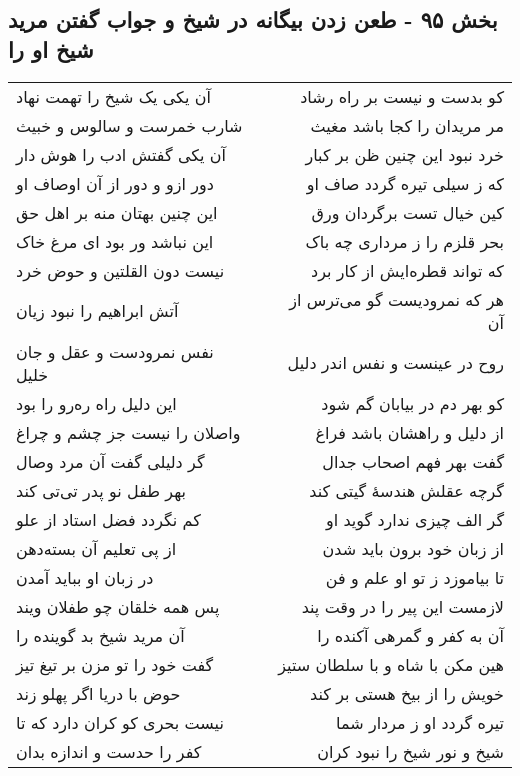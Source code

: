 \begin{center}
\section*{بخش ۹۵ - طعن زدن بیگانه در شیخ و جواب گفتن مرید شیخ او را}
\label{sec:sh095}
\begin{longtable}{l p{0.5cm} r}
آن یکی یک شیخ را تهمت نهاد
&&
کو بدست و نیست بر راه رشاد
\\
شارب خمرست و سالوس و خبیث
&&
مر مریدان را کجا باشد مغیث
\\
آن یکی گفتش ادب را هوش دار
&&
خرد نبود این چنین ظن بر کبار
\\
دور ازو و دور از آن اوصاف او
&&
که ز سیلی تیره گردد صاف او
\\
این چنین بهتان منه بر اهل حق
&&
کین خیال تست برگردان ورق
\\
این نباشد ور بود ای مرغ خاک
&&
بحر قلزم را ز مرداری چه باک
\\
نیست دون القلتین و حوض خرد
&&
که تواند قطره‌ایش از کار برد
\\
آتش ابراهیم را نبود زیان
&&
هر که نمرودیست گو می‌ترس از آن
\\
نفس نمرودست و عقل و جان خلیل
&&
روح در عینست و نفس اندر دلیل
\\
این دلیل راه ره‌رو را بود
&&
کو بهر دم در بیابان گم شود
\\
واصلان را نیست جز چشم و چراغ
&&
از دلیل و راهشان باشد فراغ
\\
گر دلیلی گفت آن مرد وصال
&&
گفت بهر فهم اصحاب جدال
\\
بهر طفل نو پدر تی‌تی کند
&&
گرچه عقلش هندسهٔ گیتی کند
\\
کم نگردد فضل استاد از علو
&&
گر الف چیزی ندارد گوید او
\\
از پی تعلیم آن بسته‌دهن
&&
از زبان خود برون باید شدن
\\
در زبان او بباید آمدن
&&
تا بیاموزد ز تو او علم و فن
\\
پس همه خلقان چو طفلان ویند
&&
لازمست این پیر را در وقت پند
\\
آن مرید شیخ بد گوینده را
&&
آن به کفر و گمرهی آکنده را
\\
گفت خود را تو مزن بر تیغ تیز
&&
هین مکن با شاه و با سلطان ستیز
\\
حوض با دریا اگر پهلو زند
&&
خویش را از بیخ هستی بر کند
\\
نیست بحری کو کران دارد که تا
&&
تیره گردد او ز مردار شما
\\
کفر را حدست و اندازه بدان
&&
شیخ و نور شیخ را نبود کران
\\

\end{longtable}
\end{center}
